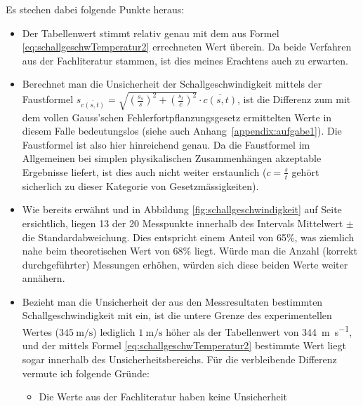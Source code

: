 Es stechen dabei folgende Punkte heraus:
\begin{itemize}
    \item
        Der   Tabellenwert   stimmt  relativ   genau   mit   dem  aus   Formel
        \ref{eq:schallgeschwTemperatur2} errechneten  Wert \"uberein. Da beide
        Verfahren  aus der  Fachliteratur stammen,  ist dies  meines Erachtens
        auch zu erwarten.
    \item
        Berechnet man  die Unsicherheit der Schallgeschwindigkeit  mittels der
        Faustformel  $s_{\overline{c(s,t)}}  = \sqrt{  \left(  \frac{s_{s}}{s}
        \right)^2   +  \left(   \frac{s_{t}}{\overline{c}}  \right)^2}   \cdot
        \overline{c(s,t)}$,   ist   die   Differenz   zum   mit   dem   vollen
        Gauss'schen  Fehlerfortpflanzungsgesetz  ermittelten Werte  in  diesem
        Falle  bedeutungslos (siehe  auch Anhang~\ref{appendix:aufgabe1}). Die
        Faustformel ist also hier hinreichend genau.
        Da  die   Faustformel  im   Allgemeinen  bei   simplen  physikalischen
        Zusammenh\"angen akzeptable  Ergebnisse liefert,  ist dies  auch nicht
        weiter erstaunlich  ($c =  \frac{s}{t}$ geh\"ort sicherlich  zu dieser
        Kategorie von Gesetzm\"assigkeiten).
    \item
        Wie bereits erw\"ahnt und in Abbildung \ref{fig:schallgeschwindigkeit}
        auf Seite  \pageref{fig:schallgeschwindigkeit} ersichtlich,  liegen 13
        der  20  Messpunkte  innerhalb  des  Intervals  Mittelwert  $\pm$  die
        Standardabweichung. Dies  entspricht   einem  Anteil  von   65\%,  was
        ziemlich nahe beim theoretischen Wert  von 68\% liegt. W\"urde man die
        Anzahl (korrekt  durchgef\"uhrter) Messungen erh\"ohen,  w\"urden sich
        diese beiden Werte weiter ann\"ahern.
    \item
        Bezieht   man   die   Unsicherheit    der   aus   den   Messresultaten
        bestimmten   Schallgeschwindigkeit    mit   ein,   ist    die   untere
        Grenze  des   experimentellen  Wertes  ($\SI{345}{\meter\per\second}$)
        lediglich  $\SI{1}{\meter\per\second}$  h\"oher als  der  Tabellenwert
        von    \SI{344}{\meter\per\second},    und    der    mittels    Formel
        \ref{eq:schallgeschwTemperatur2} bestimmte Wert  liegt sogar innerhalb
        des Unsicherheitsbereichs.
        F\"ur die verbleibende Differenz vermute ich folgende Gr\"unde:
        \begin{itemize}
            \item
                Die  Werte  aus  der Fachliteratur  haben  keine  Unsicherheit

\end{itemize}
\end{itemize}
